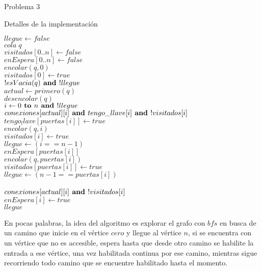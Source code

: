 \begin{section}{Problema 3}
\begin{subsection}{Detalles de la implementación}
		\begin{pseudo}
		\tab $llegue \leftarrow false$\\
		\tab $cola\; q$\\
		\tab $visitados[0..n] \leftarrow false$\\ 
		\tab $enEspera[0..n] \leftarrow false$\\ 
		\tab $encolar(q,0)$\\
		\tab $visitados[0] \leftarrow true$\\
		\tab \WHILE $!esVacia(q) \textbf{ and } !llegue$\\
		\tab \tab $actual \leftarrow primero(q)$\\
		\tab \tab $desencolar(q)$\\
		\tab \tab \FOR $ i\leftarrow0 \textbf{ to } n \textbf{ and } !llegue$\\
		\tab \tab \tab \IF	$conexiones[actual][i] \textbf{ and } tengo\_llave[i] \textbf{ and } !visitados[i]$\\
		\tab \tab \tab \tab	$tengo_llave[puertas[i]] \leftarrow true$\\
		\tab \tab \tab \tab	$encolar(q,i)$\\
		\tab \tab \tab \tab	$visitados[i] \leftarrow true$\\
		\tab \tab \tab \tab	$llegue \leftarrow (i == n-1)$\\
		\tab \tab \tab \tab \IF	$enEspera[puertas[i]]$\\
		\tab \tab \tab \tab \tab $encolar(q,puertas[i])$\\
		\tab \tab \tab \tab \tab $visitados[puertas[i]] \leftarrow true$\\
		\tab \tab \tab \tab \tab $llegue \leftarrow (n-1==puertas[i])$\\
		\tab \tab \tab \ELSE \\
		\tab \tab \tab \tab \IF $conexiones[actual][i] \textbf{ and } !visitados[i]$\\
		\tab \tab \tab \tab \tab $enEspera[i] \leftarrow true$\\
		\tab \RET $llegue$\\
		\end{pseudo}

		En pocas palabras, la idea del algoritmo es explorar el grafo con $bfs$ en busca de un camino que inicie en el vértice $cero$ y llegue al vértice $n$, si se encuentra con un vértice que no es accesible, espera hasta que desde otro camino se habilite la entrada a ese vértice, una vez habilitada continua por ese camino, mientras sigue recorriendo todo camino que se encuentre habilitado hasta el momento.\\


\end{subsection}
\end{section}
